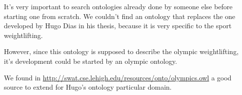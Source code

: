 \par It's very important to search ontologies already done by someone else before starting one from scratch. We couldn't find an ontology that replaces the one developed by Hugo Dias in his thesis, because it is very specific to the sport weightlifting.
\par However, since this ontology is supposed to describe the olympic weightlifting, it's development could be started by an olympic ontology. 
\par We found in \url{http://swat.cse.lehigh.edu/resources/onto/olympics.owl}  a good source to extend for Hugo's ontology particular domain. 